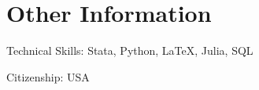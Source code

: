 \documentclass[letterpaper]{article}
\renewenvironment{itemize}{
	\begin{list}{}{
			\setlength{\leftmargin}{1.5em}
		}
	}{
	\end{list}
}
\begin{document}
	\section*{Other Information}
	\begin{itemize}
		\item Technical Skills: Stata, Python, \LaTeX, Julia, SQL
		\item Citizenship: USA
	\end{itemize}
	
	
	\bigskip
	
	
\end{document}

